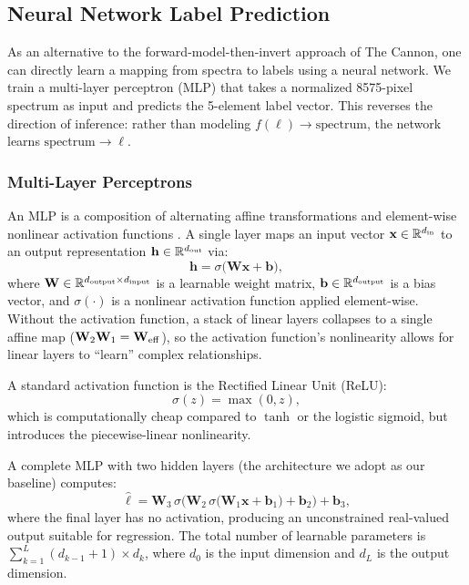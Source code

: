 \documentclass[10pt,preprint2]{aastex}
\begin{document}
\subsection{Neural Network Label Prediction}
\label{sec:nn_theory}

As an alternative to the forward-model-then-invert approach of The Cannon, one can directly learn a mapping from spectra to labels using a neural network. We train a multi-layer perceptron (MLP) that takes a normalized 8575-pixel spectrum as input and predicts the 5-element label vector. This reverses the direction of inference: rather than modeling $f(\boldsymbol{\ell}) \to \mathrm{spectrum}$, the network learns $\mathrm{spectrum} \to \boldsymbol{\ell}$.

\subsubsection{Multi-Layer Perceptrons}

An MLP is a composition of alternating affine transformations and element-wise nonlinear activation functions \citep{Goodfellow2016}. A single layer maps an input vector $\mathbf{x} \in \mathbb{R}^{d_{\rm in}}$ to an output representation $\mathbf{h} \in \mathbb{R}^{d_{\rm out}}$ via:
\begin{equation}
  \mathbf{h} = \sigma\!\bigl(\mathbf{W}\mathbf{x} + \mathbf{b}\bigr),
  \label{eq:mlp_layer}
\end{equation}
where $\mathbf{W} \in \mathbb{R}^{d_{\rm output} \times d_{\rm input}}$ is a learnable weight matrix, $\mathbf{b} \in \mathbb{R}^{d_{\rm output}}$ is a bias vector, and $\sigma(\cdot)$ is a nonlinear activation function applied element-wise. Without the activation function, a stack of linear layers collapses to a single affine map ($\mathbf{W}_2 \mathbf{W}_1 = \mathbf{W}_{\rm eff}$), so the activation function's nonlinearity allows for linear layers to ``learn'' complex relationships.

A standard activation function is the Rectified Linear Unit (ReLU):
\begin{equation}
  \sigma(z) = \max(0, z),
  \label{eq:relu}
\end{equation}
which is computationally cheap compared to $\tanh$ or the logistic sigmoid, but introduces the piecewise-linear nonlinearity.

A complete MLP with two hidden layers (the architecture we adopt as our baseline) computes:
\begin{equation}
  \hat{\boldsymbol{\ell}} = \mathbf{W}_3 \,\sigma\!\bigl(\mathbf{W}_2 \,\sigma\!\bigl(\mathbf{W}_1 \mathbf{x} + \mathbf{b}_1\bigr) + \mathbf{b}_2\bigr) + \mathbf{b}_3,
  \label{eq:mlp_full}
\end{equation}
where the final layer has no activation, producing an unconstrained real-valued output suitable for regression. The total number of learnable parameters is $\sum_{k=1}^{L}(d_{k-1} + 1) \times d_k$, where $d_0$ is the input dimension and $d_L$ is the output dimension.
\end{document}
